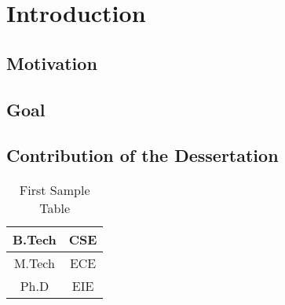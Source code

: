 
\chapter{Introduction}
 
   \blindtext

\section{Motivation}
 \blindtext
\section{Goal}
 \blindtext   
\section{Contribution of the Dessertation}
 \blindtext
 
 \begin{table}
 \begin{center}
 \caption{First Sample Table}
 \begin{tabular}{|c|c|}
 \hline
 B.Tech & CSE\\
 \hline
 M.Tech & ECE\\
 \hline
 Ph.D & EIE\\
 \hline 
 \end{tabular}
 \end{center}
\end{table}  
  

 
